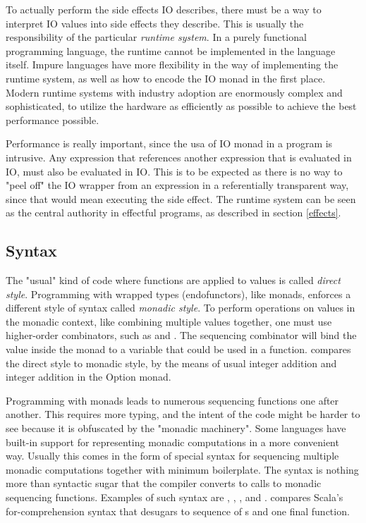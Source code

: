 To actually perform the side effects IO describes, there must be a way to interpret IO values into side effects they describe. This is usually the responsibility of the particular \textit{runtime system}. In a purely functional programming language, the runtime cannot be implemented in the language itself. Impure languages have more flexibility in the way of implementing the runtime system, as well as how to encode the IO monad in the first place. Modern runtime systems with industry adoption are enormously complex and sophisticated, to utilize the hardware as efficiently as possible to achieve the best performance possible.

Performance is really important, since the usa of IO monad in a program is intrusive.
Any expression that references another expression that is evaluated in IO, must also be evaluated in IO. This is to be expected as there is no way to "peel off" the IO wrapper from an expression in a referentially transparent way, since that would mean executing the side effect. 
The runtime system can be seen as the central authority in effectful programs, as described in section \ref{effects}.



\subsection{Syntax} \label{background:monad:syntax}
The "usual" kind of code where functions are applied to values is called \textit{direct style}. Programming with wrapped types (endofunctors), like monads, enforces a different style of syntax called \textit{monadic style}. To perform operations on values in the monadic context, like combining multiple values together, one must use higher-order combinators, such as  and . The sequencing combinator will bind the value inside the monad to a variable that could be used in a function.  compares the direct style to monadic style, by the means of usual integer addition and integer addition in the Option monad.



Programming with monads leads to numerous sequencing functions one after another. This requires more typing, and the intent of the code might be harder to see because it is obfuscated by the "monadic machinery". Some languages have built-in support for representing monadic computations in a more convenient way. Usually this comes in the form of special syntax for sequencing multiple monadic computations together with minimum boilerplate. The syntax is nothing more than syntactic sugar that the compiler converts to calls to monadic sequencing functions. Examples of such syntax are \textcite{haskell-do-notation}, \textcite{scala-for-comprehension}, \textcite{fsharp-computation-expression}, and \textcite{ocaml-bind-ops}.  compares Scala's for-comprehension syntax that desugars to sequence of s and one final  function.


